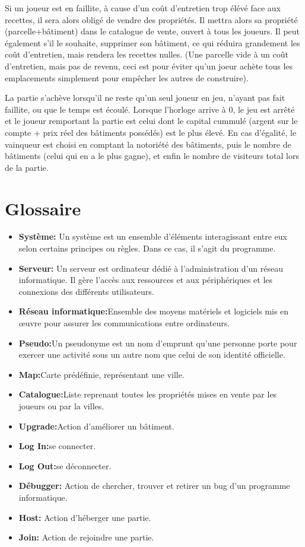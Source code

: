 \documentclass[a4paper,11pt]{report}
\begin{document}
Si un joueur est en faillite, à cause d'un coût d'entretien trop élévé face aux recettes, il sera alors obligé de vendre des propriétés. Il mettra alors sa propriété (parcelle+bâtiment) dans le catalogue de vente, ouvert à tous les joueurs.
Il peut également s'il le souhaite, supprimer son bâtiment, ce qui réduira grandement les coût d'entretien, mais rendera les recettes nulles. (Une parcelle vide à un coût d'entretien, mais pas de revenu, ceci est pour éviter qu'un joeur achète tous les emplacements simplement pour empêcher les autres de construire).

La partie s'achève lorsqu'il ne reste qu'un seul joueur en jeu, n'ayant pas fait faillite, ou que le temps est écoulé. Lorsque l'horloge arrive à 0, le jeu est arrêté et le joueur remportant la partie est celui dont le capital cummulé (argent sur le compte + prix réel des bâtiments possédés) est le plus élevé. En cas d'égalité, le vainqueur est choisi en comptant la notoriété des bâtiments, puis le nombre de bâtiments (celui qui en a le plus gagne), et enfin le nombre de visiteurs total lors de la partie.

\newpage
\section{Glossaire}
\begin{itemize}
 \item \textbf{Système:} Un système est un ensemble d'éléments interagissant entre eux selon certains principes ou règles. Dans ce cas, il s’agit du programme.
 \item \textbf{Serveur:} Un serveur est ordinateur dédié à l'administration d'un réseau informatique. Il gère l'accès aux ressources et aux périphériques et les connexions des différents utilisateurs.
 \item \textbf{Réseau informatique:}Ensemble des moyens matériels et logiciels mis en œuvre pour assurer les communications entre ordinateurs.
 \item \textbf{Pseudo:}Un pseudonyme est un nom d'emprunt qu'une personne porte pour exercer une activité sous un autre nom que celui de son identité officielle.
 \item \textbf{Map:}Carte prédéfinie, représentant une ville.
 \item \textbf{Catalogue:}Liste reprenant toutes les propriétés mises en vente par les joueurs ou par la villes.
 \item \textbf{Upgrade:}Action d'améliorer un bâtiment.
 \item \textbf{Log In:}se connecter.
 \item \textbf{Log Out:}se déconnecter.
 \item \textbf{Débugger:} Action de chercher, trouver et retirer un bug d’un programme informatique.
 \item \textbf{Host:} Action d'héberger une partie.
 \item \textbf{Join:} Action de rejoindre une partie.
\end{itemize}
	
\end{document}
